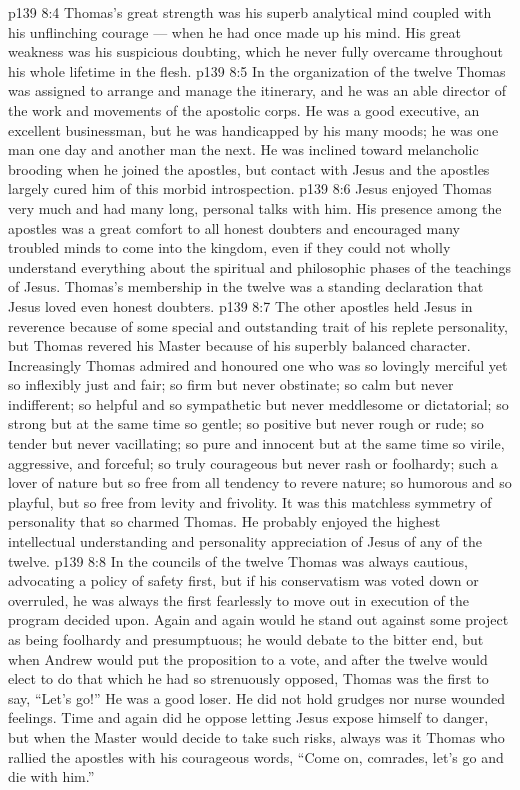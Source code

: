 \vs p139 8:4 Thomas’s great strength was his superb analytical mind coupled with his unflinching courage --- when he had once made up his mind. His great weakness was his suspicious doubting, which he never fully overcame throughout his whole lifetime in the flesh.
\vs p139 8:5 In the organization of the twelve Thomas was assigned to arrange and manage the itinerary, and he was an able director of the work and movements of the apostolic corps. He was a good executive, an excellent businessman, but he was handicapped by his many moods; he was one man one day and another man the next. He was inclined toward melancholic brooding when he joined the apostles, but contact with Jesus and the apostles largely cured him of this morbid introspection.
\vs p139 8:6 Jesus enjoyed Thomas very much and had many long, personal talks with him. His presence among the apostles was a great comfort to all honest doubters and encouraged many troubled minds to come into the kingdom, even if they could not wholly understand everything about the spiritual and philosophic phases of the teachings of Jesus. Thomas’s membership in the twelve was a standing declaration that Jesus loved even honest doubters.
\vs p139 8:7 \pc The other apostles held Jesus in reverence because of some special and outstanding trait of his replete personality, but Thomas revered his Master because of his superbly balanced character. Increasingly Thomas admired and honoured one who was so lovingly merciful yet so inflexibly just and fair; so firm but never obstinate; so calm but never indifferent; so helpful and so sympathetic but never meddlesome or dictatorial; so strong but at the same time so gentle; so positive but never rough or rude; so tender but never vacillating; so pure and innocent but at the same time so virile, aggressive, and forceful; so truly courageous but never rash or foolhardy; such a lover of nature but so free from all tendency to revere nature; so humorous and so playful, but so free from levity and frivolity. It was this matchless symmetry of personality that so charmed Thomas. He probably enjoyed the highest intellectual understanding and personality appreciation of Jesus of any of the twelve.
\vs p139 8:8 \pc In the councils of the twelve Thomas was always cautious, advocating a policy of safety first, but if his conservatism was voted down or overruled, he was always the first fearlessly to move out in execution of the program decided upon. Again and again would he stand out against some project as being foolhardy and presumptuous; he would debate to the bitter end, but when Andrew would put the proposition to a vote, and after the twelve would elect to do that which he had so strenuously opposed, Thomas was the first to say, “Let’s go!” He was a good loser. He did not hold grudges nor nurse wounded feelings. Time and again did he oppose letting Jesus expose himself to danger, but when the Master would decide to take such risks, always was it Thomas who rallied the apostles with his courageous words, “Come on, comrades, let’s go and die with him.”
